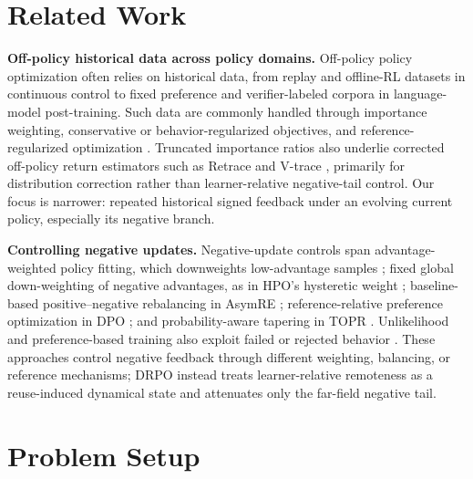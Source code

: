 \documentclass{article}
\theoremstyle{plain}
\theoremstyle{definition}
\theoremstyle{remark}
\begin{document}
\section{Related Work}
\label{sec:related_work}


\textbf{Off-policy historical data across policy domains.}
Off-policy policy optimization often relies on historical data, from replay and
offline-RL datasets in continuous control to fixed preference and verifier-labeled
corpora in language-model post-training. Such data are commonly handled through
importance weighting, conservative or behavior-regularized objectives, and
reference-regularized optimization
\citep{precup2000eligibility,fujimoto2019off,kumar2020conservative,
fujimoto2021minimalist,kostrikov2021offline,tang2026agro}. Truncated importance
ratios also underlie corrected off-policy return estimators such as Retrace and
V-trace \citep{munos2016safe,espeholt2018impala}, primarily for distribution
correction rather than learner-relative negative-tail control. Our focus is
narrower: repeated historical signed feedback under an evolving current policy,
especially its negative branch.

\textbf{Controlling negative updates.}
Negative-update controls span advantage-weighted policy fitting, which downweights
low-advantage samples
\citep{peng2019advantage,nair2020awac,kostrikov2021offline}; fixed global
down-weighting of negative advantages, as in HPO's hysteretic weight
\citep{sana2026hpo}; baseline-based positive--negative rebalancing in
AsymRE \citep{arnal2025asymmetric}; reference-relative preference optimization
in DPO \citep{rafailov2023direct}; and probability-aware tapering in TOPR
\citep{leroux2025tapered}. Unlikelihood and preference-based training also
exploit failed or rejected behavior
\citep{welleck2019neural,ethayarajh2024kto,duan2024negating,
zhang2024negative,zhu2025negative,song2025good}. These approaches control
negative feedback through different weighting, balancing, or reference
mechanisms; DRPO instead treats learner-relative remoteness as a reuse-induced
dynamical state and attenuates only the far-field negative tail.

\section{Problem Setup}
\label{sec:problem_setup}
\end{document}
